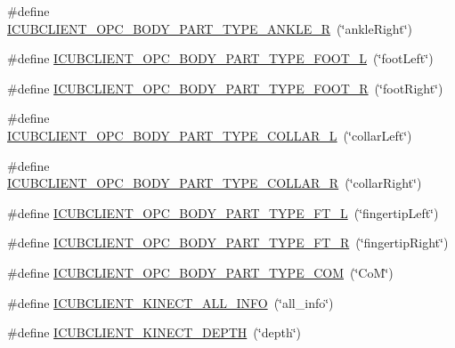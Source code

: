 \begin{DoxyCompactItemize}
\item 
\#define \hyperlink{group__icubclient__tags_gab70f6f0b598ebe2ac71cf5c24bda7ac8}{I\+C\+U\+B\+C\+L\+I\+E\+N\+T\+\_\+\+O\+P\+C\+\_\+\+B\+O\+D\+Y\+\_\+\+P\+A\+R\+T\+\_\+\+T\+Y\+P\+E\+\_\+\+A\+N\+K\+L\+E\+\_\+R}~(\char`\"{}ankle\+Right\char`\"{})
\item 
\#define \hyperlink{group__icubclient__tags_ga045f54dec7f94b4bbef957fe07ce3428}{I\+C\+U\+B\+C\+L\+I\+E\+N\+T\+\_\+\+O\+P\+C\+\_\+\+B\+O\+D\+Y\+\_\+\+P\+A\+R\+T\+\_\+\+T\+Y\+P\+E\+\_\+\+F\+O\+O\+T\+\_\+L}~(\char`\"{}foot\+Left\char`\"{})
\item 
\#define \hyperlink{group__icubclient__tags_ga229d2650f1f91c29f32fc50289e9df33}{I\+C\+U\+B\+C\+L\+I\+E\+N\+T\+\_\+\+O\+P\+C\+\_\+\+B\+O\+D\+Y\+\_\+\+P\+A\+R\+T\+\_\+\+T\+Y\+P\+E\+\_\+\+F\+O\+O\+T\+\_\+R}~(\char`\"{}foot\+Right\char`\"{})
\item 
\#define \hyperlink{group__icubclient__tags_gaf71b150f59ff5a698f31e7e41875d50c}{I\+C\+U\+B\+C\+L\+I\+E\+N\+T\+\_\+\+O\+P\+C\+\_\+\+B\+O\+D\+Y\+\_\+\+P\+A\+R\+T\+\_\+\+T\+Y\+P\+E\+\_\+\+C\+O\+L\+L\+A\+R\+\_\+L}~(\char`\"{}collar\+Left\char`\"{})
\item 
\#define \hyperlink{group__icubclient__tags_gabffc87f95deae5505b46c6b098a837d2}{I\+C\+U\+B\+C\+L\+I\+E\+N\+T\+\_\+\+O\+P\+C\+\_\+\+B\+O\+D\+Y\+\_\+\+P\+A\+R\+T\+\_\+\+T\+Y\+P\+E\+\_\+\+C\+O\+L\+L\+A\+R\+\_\+R}~(\char`\"{}collar\+Right\char`\"{})
\item 
\#define \hyperlink{group__icubclient__tags_ga2f3a37ba417d4d391c0c50b0e1012bc3}{I\+C\+U\+B\+C\+L\+I\+E\+N\+T\+\_\+\+O\+P\+C\+\_\+\+B\+O\+D\+Y\+\_\+\+P\+A\+R\+T\+\_\+\+T\+Y\+P\+E\+\_\+\+F\+T\+\_\+L}~(\char`\"{}fingertip\+Left\char`\"{})
\item 
\#define \hyperlink{group__icubclient__tags_ga4d8fa4ce73c15727bed37ca1471aeb64}{I\+C\+U\+B\+C\+L\+I\+E\+N\+T\+\_\+\+O\+P\+C\+\_\+\+B\+O\+D\+Y\+\_\+\+P\+A\+R\+T\+\_\+\+T\+Y\+P\+E\+\_\+\+F\+T\+\_\+R}~(\char`\"{}fingertip\+Right\char`\"{})
\item 
\#define \hyperlink{group__icubclient__tags_gac317fafa24f5b19ae63035af5f4103ea}{I\+C\+U\+B\+C\+L\+I\+E\+N\+T\+\_\+\+O\+P\+C\+\_\+\+B\+O\+D\+Y\+\_\+\+P\+A\+R\+T\+\_\+\+T\+Y\+P\+E\+\_\+\+C\+OM}~(\char`\"{}CoM\char`\"{})
\item 
\#define \hyperlink{group__icubclient__tags_ga76f68f4625d1373b422a119c53ffb572}{I\+C\+U\+B\+C\+L\+I\+E\+N\+T\+\_\+\+K\+I\+N\+E\+C\+T\+\_\+\+A\+L\+L\+\_\+\+I\+N\+FO}~(\char`\"{}all\+\_\+info\char`\"{})
\item 
\#define \hyperlink{group__icubclient__tags_gaacf1f516c3aae0888011693aa9b60694}{I\+C\+U\+B\+C\+L\+I\+E\+N\+T\+\_\+\+K\+I\+N\+E\+C\+T\+\_\+\+D\+E\+P\+TH}~(\char`\"{}depth\char`\"{})

\end{DoxyCompactItemize}
